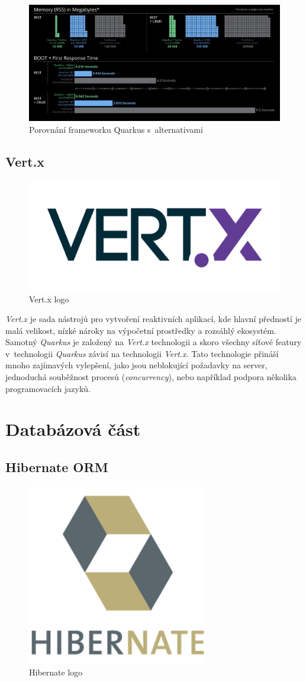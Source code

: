 \begin{figure}[hbt]
  \centering
  \includegraphics[width=1 \linewidth]{obrazky-figures/quarkus_stats.png}
  \caption{Porovnání frameworku Quarkus s~alternativami}
  \label{figure:quarkus_stats}
\end{figure}

\newpage
\subsection*{Vert.x}
\label{pouzite:vertx}
\begin{figure}[hbt]
  \centering
  \includegraphics[width=.30 \linewidth]{obrazky-figures/vertx.png}
  \caption{Vert.x logo}
\end{figure}

\emph{Vert.x} je sada nástrojů pro vytvoření reaktivních aplikací, kde hlavní předností je malá velikost, nízké nároky na výpočetní prostředky a rozsáhlý ekosystém.
Samotný \emph{Quarkus} je založený na \emph{Vert.x} technologii a skoro všechny síťové featury v~technologii \emph{Quarkus} závisí na technologii \emph{Vert.x}.
Tato technologie přináší mnoho zajímavých vylepšení, jako jsou neblokující požadavky na server, jednoduchá souběžnost procesů (\emph{concurrency}), nebo například podpora několika programovacích jazyků.~\cite{wiki:vertx}

\section{Databázová část}
\label{pouzite:db}

\subsection*{Hibernate ORM}
\label{app_prostredi:hibernate}
\begin{figure}[hbt]
  \centering
  \includegraphics[width=.2 \linewidth]{obrazky-figures/hibernate.png}
  \caption{Hibernate logo}
\end{figure}

